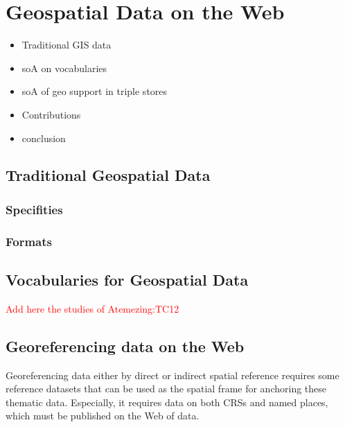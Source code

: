 \chapter{Geospatial Data on the Web}
\label{ch:ch1}

\begin{itemize}
\item Traditional GIS data
\item soA on vocabularies
\item soA of geo support in triple stores
\item Contributions
\item conclusion
\end{itemize}


\section{Traditional Geospatial Data}
   \subsection{Specifities}
   \subsection{Formats}

\section{Vocabularies for Geospatial Data}
\textcolor{red}{Add here the studies of Atemezing:TC12 }

\section{Georeferencing data on the Web}
\label{sec:georef}
Georeferencing data either by direct or indirect spatial reference requires some reference datasets that can be used as the spatial frame for anchoring these thematic data. Especially, it requires data on both CRSs and named places, which must be published on the Web of data.

